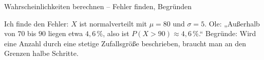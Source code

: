 \begin{aufgabe}{Wahrscheinlichkeiten berechnen – Fehler finden, Begründen}
\begin{teile}
\teil Ich finde den Fehler: $X$ ist normalverteilt mit $\mu = 80$ und $\sigma = 5$. Ole: „Außerhalb von $70$ bis $90$ liegen etwa $4{,}6\,\%$, also ist $P(X > 90) \approx 4{,}6\,\%$.“
\teil Begründe: Wird eine Anzahl durch eine stetige Zufallsgröße beschrieben, braucht man an den Grenzen halbe Schritte.
\end{teile}
\end{aufgabe}

